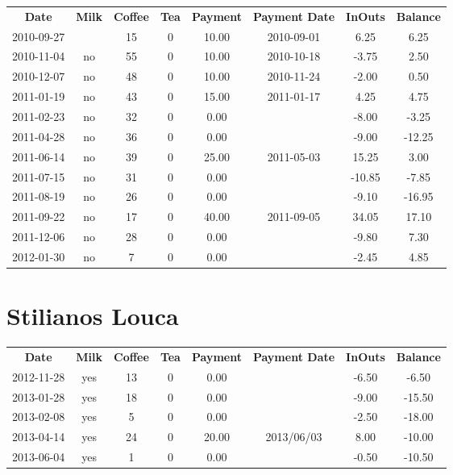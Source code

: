 \begin{center}
\begin{tabular}{cccccccc}
\textbf{Date} & \textbf{Milk} & \textbf{Coffee} & \textbf{Tea} & \textbf{Payment} & \textbf{Payment Date} & \textbf{InOuts} & \textbf{Balance} \\
2010-09-27 &  & 15 & 0 & 10.00 & 2010-09-01 &   6.25 &   6.25\\ 
2010-11-04 & no & 55 & 0 & 10.00 & 2010-10-18 &  -3.75 &   2.50\\ 
2010-12-07 & no & 48 & 0 & 10.00 & 2010-11-24 &  -2.00 &   0.50\\ 
2011-01-19 & no & 43 & 0 & 15.00 & 2011-01-17 &   4.25 &   4.75\\ 
2011-02-23 & no & 32 & 0 &  0.00 &  &  -8.00 &  -3.25\\ 
2011-04-28 & no & 36 & 0 &  0.00 &  &  -9.00 & -12.25\\ 
2011-06-14 & no & 39 & 0 & 25.00 & 2011-05-03 &  15.25 &   3.00\\ 
2011-07-15 & no & 31 & 0 &  0.00 &  & -10.85 &  -7.85\\ 
2011-08-19 & no & 26 & 0 &  0.00 &  &  -9.10 & -16.95\\ 
2011-09-22 & no & 17 & 0 & 40.00 & 2011-09-05 &  34.05 &  17.10\\ 
2011-12-06 & no & 28 & 0 &  0.00 &  &  -9.80 &   7.30\\ 
2012-01-30 & no &  7 & 0 &  0.00 &  &  -2.45 &   4.85
\end{tabular}
\end{center}

\section{Stilianos Louca}

\begin{center}
\begin{tabular}{cccccccc}
\textbf{Date} & \textbf{Milk} & \textbf{Coffee} & \textbf{Tea} & \textbf{Payment} & \textbf{Payment Date} & \textbf{InOuts} & \textbf{Balance} \\
2012-11-28 & yes & 13 & 0 &  0.00 &  & -6.50 &  -6.50\\ 
2013-01-28 & yes & 18 & 0 &  0.00 &  & -9.00 & -15.50\\ 
2013-02-08 & yes &  5 & 0 &  0.00 &  & -2.50 & -18.00\\ 
2013-04-14 & yes & 24 & 0 & 20.00 & 2013/06/03 &  8.00 & -10.00\\ 
2013-06-04 & yes &  1 & 0 &  0.00 &  & -0.50 & -10.50
\end{tabular}
\end{center}

